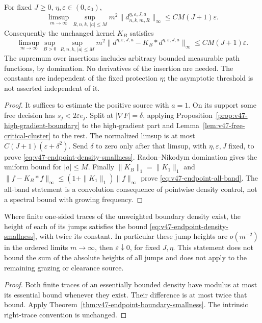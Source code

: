 \begin{theorem}
\label{thm:v47-endpoint-boundary-smallness}
For fixed $J\ge0$, $\eta,\varepsilon\in(0,\varepsilon_0)$,
\begin{equation}\label{eq:v47-endpoint-density-smallness}
 \limsup_{m\to\infty}\sup_{R,n,k,\,|a|\le M}
 m^2\|d^{\eta,\varepsilon,J,a}_{n,k,m,R}\|_\infty
                                      \le CM(J+1)\varepsilon.
\end{equation}
Consequently the unchanged kernel $K_B$ satisfies
\begin{equation}\label{eq:v47-endpoint-all-band}
 \limsup_{m\to\infty}\sup_{B>0}\sup_{R,n,k,\,|a|\le M}
 m^2\|d^{\eta,\varepsilon,J,a}-K_B*d^{\eta,\varepsilon,J,a}\|_\infty
                                      \le CM(J+1)\varepsilon.
\end{equation}
The supremum over insertions includes arbitrary bounded measurable
path functions, by domination. No derivatives of the insertion are
needed. The constants are independent of the fixed protection $\eta$;
the asymptotic threshold is not asserted independent of it.
\end{theorem}
\begin{proof}
It suffices to estimate the positive source with $a=1$. On its support
some free decision has $s_j<2\varepsilon e_j$. Split at
$|\nabla F|=\delta$, applying Proposition~\ref{prop:v47-high-gradient-boundary}
to the high-gradient part and Lemma~\ref{lem:v47-free-critical-cluster}
to the rest. The normalized limsup is at most
$C(J+1)(\varepsilon+\delta^2)$. Send $\delta$ to zero only after that
limsup, with $\eta,\varepsilon,J$ fixed, to prove
\eqref{eq:v47-endpoint-density-smallness}. Radon--Nikodym domination
gives the uniform bound for $|a|\le M$.
Finally $\|K_B\|_1=\|K_1\|_1$ and
$\|f-K_B*f\|_\infty\le(1+\|K_1\|_1)\|f\|_\infty$ prove
\eqref{eq:v47-endpoint-all-band}. The all-band statement is a
convolution consequence of pointwise density control, not a spectral
bound with growing frequency.
\end{proof}

\begin{corollary}
\label{cor:v47-endpoint-jumps}
Where finite one-sided traces of the unweighted boundary density
exist, the height of each of its jumps satisfies the bound
\eqref{eq:v47-endpoint-density-smallness}, with twice its constant.
In particular these jump heights are $o(m^{-2})$ in the ordered limits
$m\to\infty$, then $\varepsilon\downarrow0$, for fixed $J,\eta$.
This statement does not bound the sum of the absolute heights of all
jumps and does not apply to the remaining grazing or clearance source.
\end{corollary}
\begin{proof}
Both finite traces of an essentially bounded density have modulus at
most its essential bound whenever they exist. Their difference is at
most twice that bound. Apply Theorem~\ref{thm:v47-endpoint-boundary-smallness}.
The intrinsic right-trace convention is unchanged.
\end{proof}
